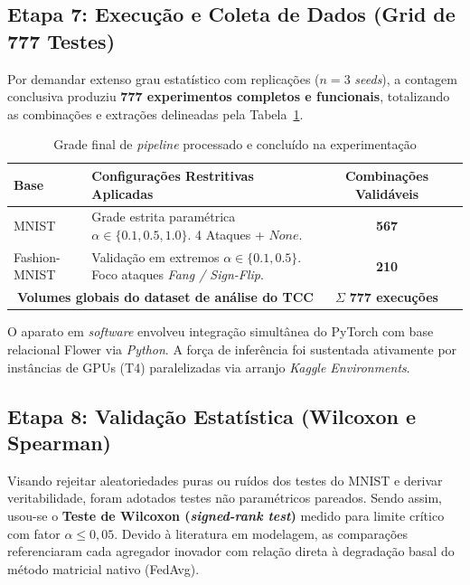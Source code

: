 \subsection{Etapa 7: Execução e Coleta de Dados (Grid de 777 Testes)}

Por demandar extenso grau estatístico com replicações ($\textit{n}=3$ \textit{seeds}), a contagem conclusiva produziu \textbf{777 experimentos completos e funcionais}, totalizando as combinações e extrações delineadas pela Tabela~\ref{tab:grids}.

\begin{table}[h]
\centering
\caption{Grade final de \textit{pipeline} processado e concluído na experimentação}
\label{tab:grids}
\footnotesize
\setlength{\tabcolsep}{3pt}
\begin{tabular}{@{}llcc@{}}
\toprule
\textbf{Base} & \textbf{Configurações Restritivas Aplicadas} & \textbf{Combinações Validáveis} \\
\midrule
MNIST & Grade estrita paramétrica $\alpha \in \{0.1, 0.5, 1.0\}$. 4 Ataques + $None$. & \textbf{567} \\
Fashion-MNIST & Validação em extremos $\alpha \in \{0.1, 0.5\}$. Foco ataques \textit{Fang / Sign-Flip}. & \textbf{210} \\
\midrule
\multicolumn{2}{c}{\textbf{Volumes globais do dataset de análise do TCC}} & $\Sigma$ \textbf{777 execuções}\\
\bottomrule
\end{tabular}
\end{table}

O aparato em \textit{software} envolveu integração simultânea do PyTorch com base relacional Flower via \textit{Python}. A força de inferência foi sustentada ativamente por instâncias de GPUs (T4) paralelizadas via arranjo \textit{Kaggle Environments}. 

\subsection{Etapa 8: Validação Estatística (Wilcoxon e Spearman)}

Visando rejeitar aleatoriedades puras ou ruídos dos testes do MNIST e derivar veritabilidade, foram adotados testes não paramétricos pareados.
Sendo assim, usou-se o \textbf{Teste de Wilcoxon (\textit{signed-rank test})} medido para limite crítico com fator $\alpha \leq 0,05$. Devido à literatura em modelagem, as comparações referenciaram cada agregador inovador com relação direta à degradação basal do método matricial nativo (FedAvg).

